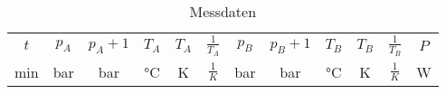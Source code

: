 \documentclass[captions=tableheading]{scrartcl}
\begin{document}
\begin{landscape}


\begin{table}
  \centering
  \caption{Messdaten}
  \label{tab:some_data}
  \begin{tabular}{c c c c c c c c c c c c}
    \toprule
    $t$ & $p_A$ & $p_A+1$ & $T_A$ & $T_A$ & $\frac{1}{T_A}$ & $p_B$ & $p_B+1$ & $T_B$ & $T_B$ & $\frac{1}{T_B}$ & $P$\\
    min &   bar &     bar &    °C &     K &   $\frac{1}{K}$ &   bar &     bar &    °C &     K &   $\frac{1}{K}$ &  W \\
    \midrule
      
    \bottomrule
  \end{tabular}
\end{table}

\end{landscape}
\end{document}
